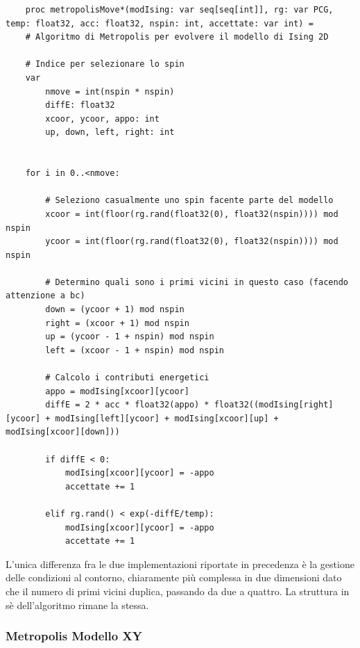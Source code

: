 \begin{verbatim}
    proc metropolisMove*(modIsing: var seq[seq[int]], rg: var PCG, temp: float32, acc: float32, nspin: int, accettate: var int) = 
    # Algoritmo di Metropolis per evolvere il modello di Ising 2D

    # Indice per selezionare lo spin
    var 
        nmove = int(nspin * nspin)
        diffE: float32
        xcoor, ycoor, appo: int
        up, down, left, right: int


    for i in 0..<nmove:

        # Seleziono casualmente uno spin facente parte del modello
        xcoor = int(floor(rg.rand(float32(0), float32(nspin)))) mod nspin
        ycoor = int(floor(rg.rand(float32(0), float32(nspin)))) mod nspin

        # Determino quali sono i primi vicini in questo caso (facendo attenzione a bc)
        down = (ycoor + 1) mod nspin
        right = (xcoor + 1) mod nspin
        up = (ycoor - 1 + nspin) mod nspin
        left = (xcoor - 1 + nspin) mod nspin

        # Calcolo i contributi energetici
        appo = modIsing[xcoor][ycoor]
        diffE = 2 * acc * float32(appo) * float32((modIsing[right][ycoor] + modIsing[left][ycoor] + modIsing[xcoor][up] + modIsing[xcoor][down]))

        if diffE < 0:
            modIsing[xcoor][ycoor] = -appo
            accettate += 1

        elif rg.rand() < exp(-diffE/temp):
            modIsing[xcoor][ycoor] = -appo
            accettate += 1
\end{verbatim}    

L'unica differenza fra le due implementazioni riportate in precedenza è la gestione delle condizioni al 
contorno, chiaramente più complessa in due dimensioni dato che il numero di primi vicini duplica, passando 
da due a quattro. La struttura in sè dell'algoritmo rimane la stessa. 





\subsubsection{Metropolis Modello XY}

